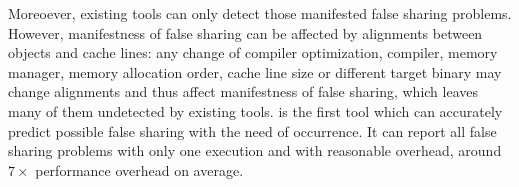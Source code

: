 Moreoever, existing tools can only detect those manifested false sharing problems.
However, manifestness of false sharing can be affected by alignments between
objects and cache lines: any change of compiler optimization, compiler, memory manager, 
memory allocation order, cache line size or different target binary 
may change alignments and thus affect manifestness of false sharing, 
which leaves many of them undetected by existing tools.
\Predator{} is the first tool which can accurately predict possible false sharing 
with the need of occurrence. 
It can report all false sharing problems with only one execution and with reasonable overhead, 
around $7\times$ performance overhead on average.

